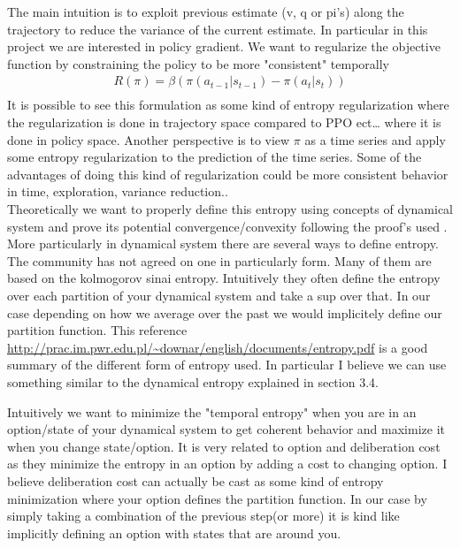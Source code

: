  The main intuition is to exploit previous estimate (v, q or pi’s) along the trajectory to reduce the variance of the current estimate. In particular in this project we are interested in policy gradient. We want to regularize the objective function by constraining the policy to be more "consistent" temporally 
\begin{equation}
\begin{split}
    R(\pi) = \beta ( \pi(a_{t-1}|s_{t-1}) - \pi(a_t|s_t)) \\
\end{split}
\end{equation}
It is possible to see this formulation as some kind of entropy regularization where the regularization is done in trajectory space compared to PPO ect… where it is done in policy space. Another perspective is to view $\pi$ as a time series and apply some entropy regularization to the prediction of the time series. Some of the advantages of doing this kind of regularization could be more consistent behavior in time, exploration, variance reduction.. \\
Theoretically we want to properly define this entropy using concepts of dynamical system and prove its potential convergence/convexity following the proof's used \citep{neu2017unified}.\\
More particularly in dynamical system there are several ways to define entropy. The community has not agreed on one in particularly form. Many of them are based on the kolmogorov sinai entropy. Intuitively they often define the entropy over each partition of your dynamical system and take a sup over that. In our case depending on how we average over the past we would implicitely define our partition function. This reference \url{http://prac.im.pwr.edu.pl/~downar/english/documents/entropy.pdf} is a good summary of the different form of entropy used. In particular I believe we can use something similar to the dynamical entropy explained in section 3.4.

Intuitively we want to minimize the "temporal entropy" when you are in an option/state of your dynamical system to get coherent behavior and maximize it when you change state/option. It is very related to option and deliberation cost \citep{harb2017waiting} as they minimize the entropy in an option by adding a cost to changing option. I believe deliberation cost can actually be cast as some kind of entropy minimization where your option defines the partition function. In our case by simply taking a combination of the previous step(or more) it is kind like implicitly defining an option with states that are around you.
